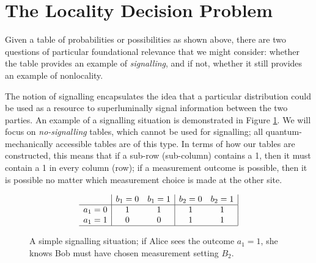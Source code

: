 \documentclass[reprint]{revtex4-1}
\theoremstyle{definition}
\begin{document}


\section{The Locality Decision Problem}


Given a table of probabilities or possibilities as shown above, there are two questions of particular foundational relevance that we might consider: whether the table provides an example of \emph{signalling}, and if not, whether it still provides an example of nonlocality.

The notion of signalling encapsulates the idea that a particular distribution could be used as a resource to superluminally signal information between the two parties. An example of a signalling situation is demonstrated in Figure \ref{sig}. We will focus on \emph{no-signalling} tables, which cannot be used for signalling; all quantum-mechanically accessible tables are of this type. In terms of how our tables are constructed, this means that if a sub-row (sub-column) contains a 1, then it must contain a 1 in every column (row); if a measurement outcome is possible, then it is possible no matter which measurement choice is made at the other site.
\begin{figure}
\begin{equation*}
\begin{array}{c| c c | c c |}
&b_1=0&b_1=1&b_2=0&b_2=1\\ \hline
a_1=0&1 &1  &1 & 1\\
a_1=1&0&0 &1 &1\\ \hline
\end{array} 
\end{equation*}
\caption{A simple signalling situation; if Alice sees the outcome $a_1=1$, she knows Bob must have chosen measurement setting $B_2$.}
\label{sig}
\end{figure}
\end{document}
